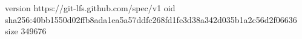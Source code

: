 version https://git-lfs.github.com/spec/v1
oid sha256:40bb1550d02ffb8ada1ea5a57ddfc268fd1fe3d38a342d035b1a2c56d2f06636
size 349676
